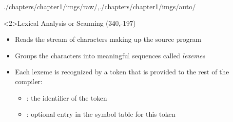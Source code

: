 \begin{graphicspathcontext}{{./chapters/chapter1/imgs/raw/},{./chapters/chapter1/imgs/auto/}}
\begin{bibunit}[apalike]
\begin{frame}<2>{{Lexical Analysis} or Scanning}
	\putat*(340,-197){}
	\begin{minipage}{.8\linewidth}
	\begin{itemize}
	\item Reads the stream of characters making up the source program
	\item Groups the characters into meaningful sequences called \emph{lexemes}
	\item Each lexeme is recognized by a token that is provided to the rest of the compiler:
		\begin{center}
		\end{center}
		\begin{itemize}
		\item {}: the identifier of the token
		\item {}: optional entry in the symbol table for this token
		\end{itemize}
		\end{itemize}
	\end{minipage}
\end{frame}


\end{bibunit}
\end{graphicspathcontext}
